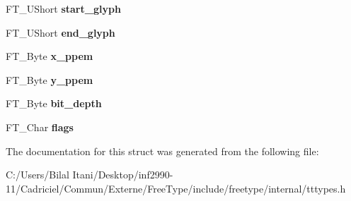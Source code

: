 \begin{DoxyCompactItemize}
\item 
F\+T\+\_\+\+U\+Short {\bfseries start\+\_\+glyph}\hypertarget{struct_t_t___s_bit___strike_rec___a05032d4092eef7e7214bb82d4113d8b9}{}\label{struct_t_t___s_bit___strike_rec___a05032d4092eef7e7214bb82d4113d8b9}

\item 
F\+T\+\_\+\+U\+Short {\bfseries end\+\_\+glyph}\hypertarget{struct_t_t___s_bit___strike_rec___a1af21e0ef936193b22575ea75bad487f}{}\label{struct_t_t___s_bit___strike_rec___a1af21e0ef936193b22575ea75bad487f}

\item 
F\+T\+\_\+\+Byte {\bfseries x\+\_\+ppem}\hypertarget{struct_t_t___s_bit___strike_rec___a2a1b17c24df2084fe485aefe8f34e7d4}{}\label{struct_t_t___s_bit___strike_rec___a2a1b17c24df2084fe485aefe8f34e7d4}

\item 
F\+T\+\_\+\+Byte {\bfseries y\+\_\+ppem}\hypertarget{struct_t_t___s_bit___strike_rec___ad618814b841b86e7763f1aa371e04fed}{}\label{struct_t_t___s_bit___strike_rec___ad618814b841b86e7763f1aa371e04fed}

\item 
F\+T\+\_\+\+Byte {\bfseries bit\+\_\+depth}\hypertarget{struct_t_t___s_bit___strike_rec___ac57b360af4620bd06251d098f5da23bb}{}\label{struct_t_t___s_bit___strike_rec___ac57b360af4620bd06251d098f5da23bb}

\item 
F\+T\+\_\+\+Char {\bfseries flags}\hypertarget{struct_t_t___s_bit___strike_rec___a38735f8c00b23deb25ffab798c0aa7b7}{}\label{struct_t_t___s_bit___strike_rec___a38735f8c00b23deb25ffab798c0aa7b7}

\end{DoxyCompactItemize}


The documentation for this struct was generated from the following file\+:\begin{DoxyCompactItemize}
\item 
C\+:/\+Users/\+Bilal Itani/\+Desktop/inf2990-\/11/\+Cadriciel/\+Commun/\+Externe/\+Free\+Type/include/freetype/internal/tttypes.\+h\end{DoxyCompactItemize}
